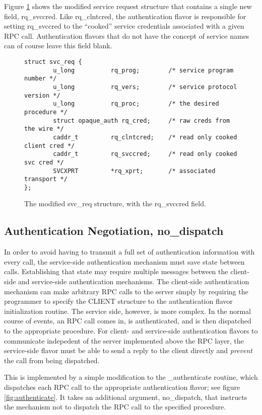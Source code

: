 Figure \ref{fig:svc-req} shows the modified service request structure
that contains a single new field, rq_svccred.  Like rq_clntcred, the
authentication flavor is responsible for setting rq_svccred to the
``cooked'' service credentials associated with a given RPC call.
Authentication flavors that do not have the concept of service names
can of course leave this field blank.

\begin{figure}[htbp]
\begin{verbatim}
struct svc_req {
        u_long          rq_prog;        /* service program number */
        u_long          rq_vers;        /* service protocol version */
        u_long          rq_proc;        /* the desired procedure */
        struct opaque_auth rq_cred;     /* raw creds from the wire */
        caddr_t         rq_clntcred;    /* read only cooked client cred */
        caddr_t         rq_svccred;     /* read only cooked svc cred */
        SVCXPRT         *rq_xprt;       /* associated transport */
};
\end{verbatim}
\caption{The modified svc_req structure, with the rq_svccred field.}
\label{fig:svc-req}
\end{figure}



\subsection{Authentication Negotiation, no_dispatch}

In order to avoid having to transmit a full set of authentication
information with every call, the service-side authentication mechanism
must save state between calls.  Establishing that state may require
multiple messages between the client-side and service-side
authentication mechanisms.  The client-side authentication mechanism
can make arbitrary RPC calls to the server simply by requiring the
programmer to specify the CLIENT structure to the authentication
flavor initialization routine.  The service side, however, is more
complex.  In the normal course of events, an RPC call comes in, is
authenticated, and is then dispatched to the appropriate procedure.
For client- and service-side authentication flavors to communicate
indepedent of the server implemented above the RPC layer, the
service-side flavor must be able to send a reply to the client
directly and {\it prevent} the call from being dispatched.

This is implemented by a simple modification to the _authenticate
routine, which dispatches each RPC call to the appropriate
authentication flavor; see figure \ref{fig:authenticate}.  It takes an
additional argument, no_dispatch, that instructs the mechanism not to
dispatch the RPC call to the specified procedure.

